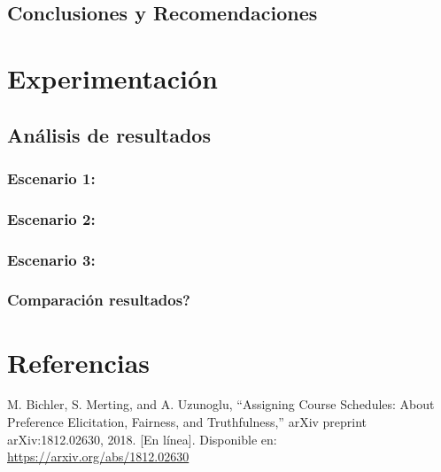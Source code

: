 \documentclass{article}
\begin{document}
\subsection{Conclusiones y Recomendaciones}



\section{Experimentación}\label{sec:exp}

\subsection{Análisis de resultados}

\subsubsection{Escenario 1: }

\subsubsection{Escenario 2: }
 
\subsubsection{Escenario 3: }

\subsubsection{Comparación resultados?}



\section{Referencias}
\renewcommand{\refname}{}

\begin{thebibliography}{9}

 \label{ref:BPS} M. Bichler, S. Merting, and A. Uzunoglu, 
“Assigning Course Schedules: About Preference Elicitation, Fairness, and Truthfulness,” 
arXiv preprint arXiv:1812.02630, 2018. [En línea]. Disponible en: 
\url{https://arxiv.org/abs/1812.02630}


\end{thebibliography}
\end{document}
